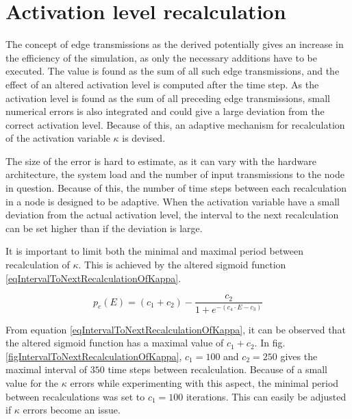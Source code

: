 \section{Activation level recalculation} 		%
\label{appendixRecalculateKappaClass}
	The concept of edge transmissions as the derived potentially gives an increase in the efficiency of the simulation, as only the necessary additions have to be executed.
	The value is found as the sum of all such edge transmissions, and the effect of an altered activation level is computed after the time step.
	As the activation level is found as the sum of all preceding edge transmissions, small numerical errors is also integrated and could give a large deviation from the correct activation level.
	Because of this, an adaptive mechanism for recalculation of the activation variable $\kappa$ is devised.

	The size of the error is hard to estimate, as it can vary with the hardware architecture, the system load and the number of input transmissions to the node in question.
	Because of this, the number of time steps between each recalculation in a node is designed to be adaptive.
	When the activation variable have a small deviation from the actual activation level, the interval to the next recalculation can be set higher than if the deviation is large.

	It is important to limit both the minimal and maximal period between recalculation of $\kappa$.
	This is achieved by the altered sigmoid function \eqref{eqIntervalToNextRecalculationOfKappa}. %
	
\begin{equation}
	p_e(E) = (c_1 + c_2) - \frac{c_2}{1+e^{-(c_4\cdot E - c_3)}}
	\label{eqIntervalToNextRecalculationOfKappa}
\end{equation}

	From equation \eqref{eqIntervalToNextRecalculationOfKappa}, it can be observed that the altered sigmoid function has a maximal value of $c_1+c_2$.
	In fig. \ref{figIntervalToNextRecalculationOfKappa}, $c_1=100$ and $c_2=250$ gives the maximal interval of $350$ time steps between recalculation.
	Because of a small value for the $\kappa$ errors while experimenting with this aspect, the minimal period between recalculations was set to $c_1 = 100$ iterations.
	This can easily be adjusted if $\kappa$ errors become an issue.
	 
